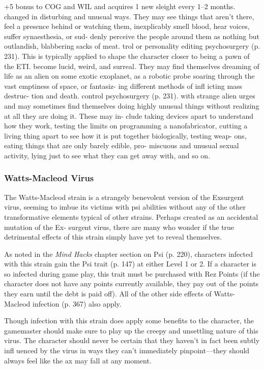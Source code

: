 +5 bonus to COG and WIL and acquires 1 new 
sleight every 1–2 months.
changed in disturbing and unusual ways. They 
may see things that aren't there, feel a presence 
behind or watching them, inexplicably smell 
blood, hear voices, suffer synaesthesia, or sud-
denly perceive the people around them as nothing 
but outlandish, blabbering sacks of meat.
trol or personality editing psychosurgery (p. 231). 
This is typically applied to shape the character 
closer to being a pawn of the ETI.
become lucid, weird, and surreal. They may find 
themselves dreaming of life as an alien on some 
exotic exoplanet, as a robotic probe soaring 
through the vast emptiness of space, or fantasiz-
ing different methods of infl icting mass destruc-
tion and death.
control psychosurgery (p. 231). 
with strange alien urges and may sometimes find 
themselves doing highly unusual things without 
realizing at all they are doing it. These may in-
clude taking devices apart to understand how 
they work, testing the limits on programming a 
nanofabricator, cutting a living thing apart to see 
how it is put together biologically, testing weap-
ons, eating things that are only barely edible, pro-
miscuous and unusual sexual activity, lying just 
to see what they can get away with, and so on.

\subsubsection{Watts-Macleod Virus}

The Watts-Macleod strain is a strangely benevolent 
version of the Exsurgent virus, seeming to imbue its 
victims with psi abilities without any of the other 
transformative elements typical of other strains. 
Perhaps created as an accidental mutation of the Ex-
surgent virus, there are many who wonder if the true 
detrimental effects of this strain simply have yet to 
reveal themselves.

As noted in the \textit{Mind Hacks} chapter section on Psi 
(p. 220), characters infected with this strain gain the 
Psi trait (p. 147) at either Level 1 or 2. If a character 
is so infected during game play, this trait must be 
purchased with Rez Points (if the character does not 
have any points currently available, they pay out of 
the points they earn until the debt is paid off). All of 
the other side effects of Watts-Macleod infection (p. 
367) also apply.

Though infection with this strain does apply some 
benefits to the character, the gamemaster should make 
sure to play up the creepy and unsettling nature of 
this virus. The character should never be certain that 
they haven't in fact been subtly infl uenced by the virus 
in ways they can't immediately pinpoint—they should 
always feel like the ax may fall at any moment.

